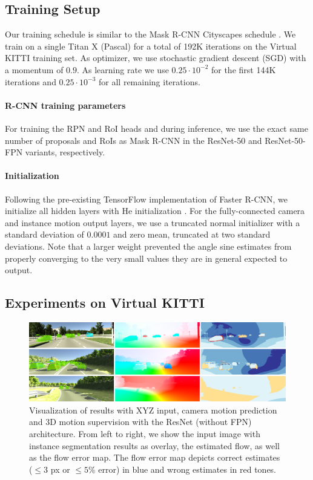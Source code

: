 \subsection{Training Setup}
\label{ssec:setup}
Our training schedule is similar to the Mask R-CNN Cityscapes schedule \cite{MaskRCNN}.
We train on a single Titan X (Pascal) for a total of 192K iterations on the
Virtual KITTI training set.
As optimizer, we use stochastic gradient descent (SGD) \cite{SGD} with a
momentum of $0.9$.
As learning rate we use $0.25 \cdot 10^{-2}$ for the
first 144K iterations and $0.25 \cdot 10^{-3}$ for all remaining iterations.

\paragraph{R-CNN training parameters}
For training the RPN and RoI heads and during inference,
we use the exact same number of proposals and RoIs as Mask R-CNN in
the ResNet-50 and ResNet-50-FPN variants, respectively.

\paragraph{Initialization}
Following the pre-existing TensorFlow implementation of Faster R-CNN,
we initialize all hidden layers with He initialization \cite{He}.
For the fully-connected camera and instance motion output layers,
we use a truncated normal initializer with a standard
deviation of $0.0001$ and zero mean, truncated at two standard deviations.
Note that a larger weight prevented the
angle sine estimates from properly converging to the very small values they
are in general expected to output.


\subsection{Experiments on Virtual KITTI}
\label{ssec:vkitti}

\begin{figure}[t]
  \centering
  \includegraphics[width=\textwidth]{figures/vkitti_cam}
\caption{
Visualization of results with XYZ input, camera motion prediction and 3D motion supervision
with the ResNet (without FPN) architecture.
From left to right, we show the input image with instance segmentation results as overlay,
the estimated flow, as well as the flow error map.
The flow error map depicts correct estimates ($\leq 3$ px or $\leq 5\%$ error) in blue and wrong estimates in red tones.
}
\label{figure:vkitti}
\end{figure}


